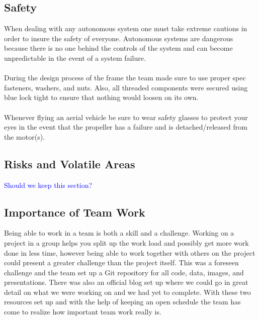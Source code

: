 \documentclass{article}
\numberwithin{equation}{section} %
\begin{document}
\subsection{Safety}
When dealing with any autonomous system one must take extreme cautions in order to insure the safety of everyone. Autonomous systems are dangerous because there is no one behind the controls of the system and can become unpredictable in the event of a system failure. \\ \\ 
During the design process of the frame the team made sure to use proper spec fasteners, washers, and nuts. Also, all threaded components were secured using blue lock tight to ensure that nothing would loosen on its own. \\ \\
Whenever flying an aerial vehicle be sure to wear safety glasses to protect your eyes in the event that the propeller has a failure and is detached/released from the motor(s).

\subsection{Risks and Volatile Areas}

\textcolor{blue}{Should we keep this section?}

\subsection{Importance of Team Work}
Being able to work in a team is both a skill and a challenge. Working on a project in a group helps you split up the work load and possibly get more work done in less time, however being able to work together with others on the project could present a greater challenge than the project itself. This was a foreseen challenge and the team set up a Git repository for all code, data, images, and presentations. There was also an official blog set up where we could go in great detail on what we were working on and we had yet to complete. With these two resources set up and with the help of keeping an open schedule the team has come to realize how important team work really is.
\end{document}
